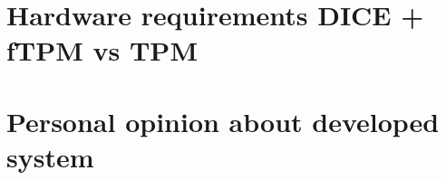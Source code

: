 
\section{Hardware requirements DICE + fTPM vs TPM}


\section{Personal opinion about developed system}

